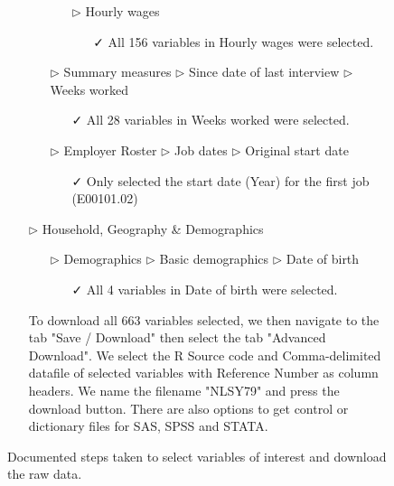 \documentclass{article}
\begin{document}
\begin{figure}[t]
\begin{tcolorbox}[title = Navigating the data source]
\begin{itemize}
\begin{itemize}
\begin{itemize}
\begin{itemize}
\end{itemize}
\item[$\triangleright$] Hourly wages
\begin{itemize}
\item[\faCheck] All 156 variables in Hourly wages were selected.
\end{itemize}
\end{itemize}
\end{itemize}
\begin{itemize}
\item[$\triangleright$] Summary measures $\triangleright$ Since date of last interview $\triangleright$ Weeks worked
\begin{itemize}
\item[\faCheck] All 28 variables in Weeks worked were selected.
\end{itemize}
\end{itemize}
\begin{itemize}
\item[$\triangleright$] Employer Roster $\triangleright$ Job dates $\triangleright$ Original start date
\begin{itemize}
\item[\faCheck] Only selected the start date (Year) for the first job (E00101.02)
\end{itemize}
\end{itemize}
\item[$\triangleright$] Household, Geography \& Demographics
\begin{itemize}
\item[$\triangleright$] Demographics $\triangleright$ Basic demographics $\triangleright$ Date of birth
\begin{itemize}
\item[\faCheck] All 4 variables in Date of birth were selected. 
\end{itemize}
\end{itemize}
\end{itemize}
\begin{itemize}
\item[\faCloudDownload] To download all 663 variables selected, we then navigate to the tab "Save / Download" then select the tab "Advanced Download". We select the R Source code and Comma-delimited datafile of selected variables with Reference Number as column headers. We name the filename "NLSY79" and press the download button. There are also options to get control or dictionary files for SAS, SPSS and STATA. 
\end{itemize}
\end{tcolorbox}
\caption{Documented steps taken to select variables of interest and download the raw data.\label{fig:source-nav}}
\end{figure}
\end{document}
